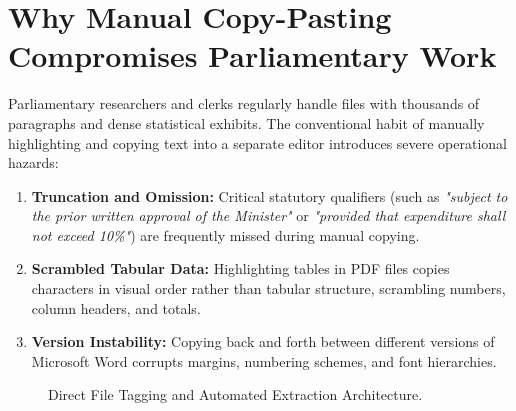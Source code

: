 \documentclass[11pt, a4paper]{report}
\begin{document}
\section{Why Manual Copy-Pasting Compromises Parliamentary Work}
Parliamentary researchers and clerks regularly handle files with thousands of paragraphs and dense statistical exhibits. The conventional habit of manually highlighting and copying text into a separate editor introduces severe operational hazards:
\begin{enumerate}
    \item \textbf{Truncation and Omission:} Critical statutory qualifiers (such as \textit{"subject to the prior written approval of the Minister"} or \textit{"provided that expenditure shall not exceed 10\%"}) are frequently missed during manual copying.
    \item \textbf{Scrambled Tabular Data:} Highlighting tables in PDF files copies characters in visual order rather than tabular structure, scrambling numbers, column headers, and totals.
    \item \textbf{Version Instability:} Copying back and forth between different versions of Microsoft Word corrupts margins, numbering schemes, and font hierarchies.
\end{enumerate}

\begin{figure}[htbp]
  \centering
  \caption{Direct File Tagging and Automated Extraction Architecture.}
  \label{fig:auto_ingestion_arch}
\end{figure}
\end{document}
